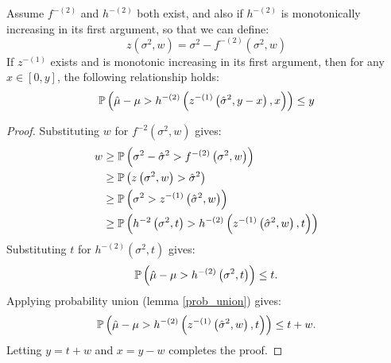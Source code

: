 \begin{theorem}\label{ebb1} 
Assume $f^{-(2)}$ and $h^{-(2)}$ both exist, and also if $h^{-(2)}$ is monotonically increasing in its first argument, so that we can define:
\[
z(\sigma^2,w) = \sigma^2-f^{-(2)}\left(\sigma^2,w\right)
\]
If $z^{-(1)}$ exists and is monotonic increasing in its first argument, then for any $x\in[0,y]$, the following relationship holds:
\[
\operatorname{\mathbb{P}}\left(\hat{\mu}-\mu>h^{-(2)}\left(z^{-(1)}\left(\hat{\sigma}^2,y-x\right),x\right)\right)
\le y
\]
\end{theorem}
%
\begin{proof}
Substituting $w$ for $f^{-2}(\sigma^2,w)$ gives:
\begin{align*}
w & \ge \operatorname{\mathbb{P}}\left(\sigma^2-\hat{\sigma}^2>f^{-(2)}\left(\sigma^2,w\right)\right)\\
 & \ge \operatorname{\mathbb{P}}\left(z\left(\sigma^2,w\right)>\hat{\sigma}^2\right)\\
 & \ge \operatorname{\mathbb{P}}\left(\sigma^2>z^{-(1)}\left(\hat{\sigma}^2,w\right)\right)\\
 & \ge \operatorname{\mathbb{P}}\left(h^{-2}\left(\sigma^2,t\right)>h^{-(2)}\left(z^{-(1)}\left(\hat{\sigma}^2,w\right),t\right)\right)
\end{align*}
Substituting $t$ for $h^{-(2)}(\sigma^2,t)$ gives:
\[
\operatorname{\mathbb{P}}\left(\hat{\mu}-\mu>h^{-(2)}\left(\sigma^2,t\right)\right)
\le t.
\]
Applying probability union (lemma \ref{prob_union}) gives:\\
\[
\operatorname{\mathbb{P}}\left(\hat{\mu}-\mu>h^{-(2)}\left(z^{-(1)}\left(\hat{\sigma}^2,w\right),t\right)\right)
\le t+w.
\]
Letting $y=t+w$ and $x=y-w$ completes the proof.
\end{proof}

